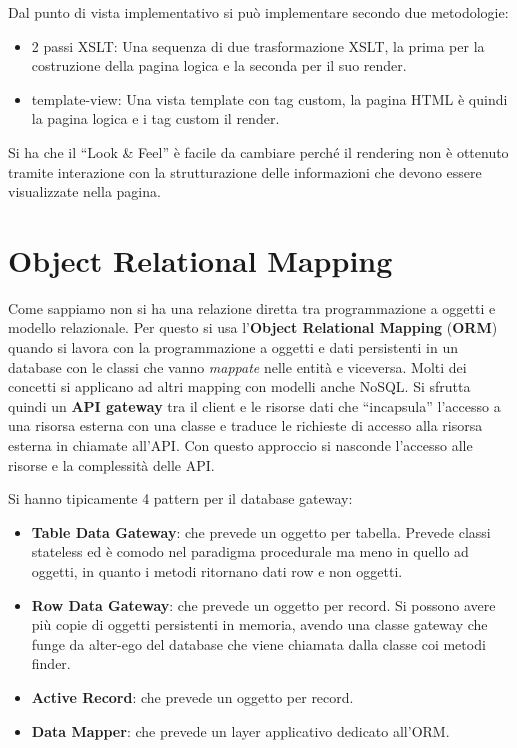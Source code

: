 \begin{itemize}
            Dal punto di vista implementativo si può implementare secondo due
            metodologie:
            \begin{itemize}
                  \item 2 passi XSLT: Una sequenza di due trasformazione XSLT,
                        la prima per la costruzione della pagina logica e la
                        seconda per il suo render.
                  \item template-view: Una vista template con tag custom, la pagina
                        HTML è quindi la pagina logica e i tag custom il render.
            \end{itemize}
            Si ha che il “Look \& Feel” è facile da cambiare perché il rendering
            non è ottenuto tramite interazione con la strutturazione delle
            informazioni che devono essere visualizzate nella pagina.
\end{itemize}
\section{Object Relational Mapping}
Come sappiamo non si ha una relazione diretta tra programmazione a oggetti e
modello relazionale. Per questo si usa l'\textbf{Object Relational Mapping}
(\textbf{ORM}) quando si lavora con la programmazione a oggetti e dati persistenti
in un database con le classi che vanno \textit{mappate} nelle entità e viceversa.
Molti dei concetti si applicano ad altri mapping con modelli anche NoSQL. Si sfrutta
quindi un \textbf{API gateway} tra il client e le risorse dati che “incapsula”
l'accesso a una risorsa esterna con una classe e traduce le richieste di accesso
alla risorsa esterna in chiamate all'API. Con questo approccio si nasconde l'accesso
alle risorse e la complessità delle API.

Si hanno tipicamente 4 pattern per il database gateway:
\begin{itemize}
      \item \textbf{Table Data Gateway}: che prevede un oggetto per tabella. Prevede
            classi stateless ed è comodo nel paradigma procedurale ma meno in
            quello ad oggetti, in quanto i metodi ritornano dati row e non oggetti.
      \item \textbf{Row Data Gateway}: che prevede un oggetto per record. Si possono
            avere più copie di oggetti persistenti in memoria, avendo una classe
            gateway che funge da alter-ego del database che viene chiamata dalla
            classe coi metodi finder.
      \item \textbf{Active Record}: che prevede un oggetto per record.
      \item \textbf{Data Mapper}: che prevede un layer applicativo dedicato all'ORM.
\end{itemize}
